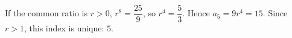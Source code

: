 If the common ratio is $r>0$, $r^8=\dfrac{25}{9}$, so $r^4=\dfrac{5}{3}$. Hence $a_5=9r^4=15$. Since $r>1$, this index is unique: $\boxed5$.
